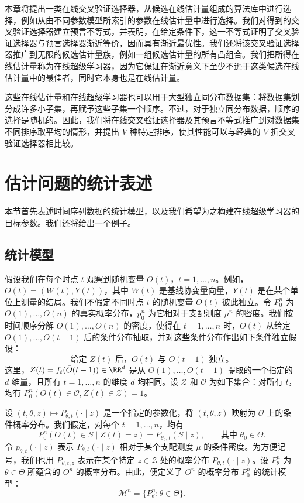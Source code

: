 \begin{sourcebox}
本章将提出一类在线交叉验证选择器，从候选在线估计量组成的算法库中进行选择，例如从由不同参数模型所索引的参数在线估计量中进行选择。我们对得到的交叉验证选择器建立预言不等式，并表明，在给定条件下，这一不等式证明了交叉验证选择器与预言选择器渐近等价，因而具有渐近最优性。我们还将该交叉验证选择器推广到无限的候选估计量族，例如一组候选估计量的所有凸组合。我们把所得在线估计量称为在线超级学习器，因为它保证在渐近意义下至少不逊于这类候选在线估计量中的最佳者，同时它本身也是在线估计量。
\end{sourcebox}

这些在线估计量和在线超级学习器也可以用于大型独立同分布数据集：将数据集划分成许多小子集，再赋予这些子集一个顺序。不过，对于独立同分布数据，顺序的选择是随机的。因此，我们将在线交叉验证选择器及其预言不等式推广到对数据集不同排序取平均的情形，并提出 $V$ 种特定排序，使其性能可以与经典的 $V$ 折交叉验证选择器相比较。

\section{估计问题的统计表述}

本节首先表述时间序列数据的统计模型，以及我们希望为之构建在线超级学习器的目标参数。我们还将给出一个例子。

\subsection{统计模型}

假设我们在每个时点 $t$ 观察到随机变量 $O(t)$，$t=1,\ldots,n$。例如，$O(t)=(W(t),Y(t))$，其中 $W(t)$ 是基线协变量向量，$Y(t)$ 是在某个单位上测量的结局。我们不假定不同时点 $t$ 的随机变量 $O(t)$ 彼此独立。令 $P_0^n$ 为 $O(1),\ldots,O(n)$ 的真实概率分布，$p_0^n$ 为它相对于支配测度 $\mu^n$ 的密度。我们按时间顺序分解 $O(1),\ldots,O(n)$ 的密度，使得在 $t=1,\ldots,n$ 时，$O(t)$ 从给定 $O(1),\ldots,O(t-1)$ 后的条件分布抽取，并对这些条件分布作出如下条件独立假设：
\begin{equation}
 \text{给定 }Z(t)\text{ 后，}O(t)\text{ 与 }\bar O(t-1)\text{ 独立。}
 \tag{18.1}
\end{equation}
这里，$Z(t)=f_t(\bar O(t-1))\in\RR^d$ 是从 $O(1),\ldots,O(t-1)$ 提取的一个指定的 $d$ 维量，且所有 $t=1,\ldots,n$ 的维度 $d$ 均相同。设 $\mathcal Z$ 和 $\mathcal O$ 为如下集合：对所有 $t$，均有 $P_0^n(O(t)\in\mathcal O,Z(t)\in\mathcal Z)=1$。

设 $(t,\theta,z)\mapsto P_{\theta,t}(\cdot\mid z)$ 是一个指定的参数化，将 $(t,\theta,z)$ 映射为 $\mathcal O$ 上的条件概率分布。我们假定，对每个 $t=1,\ldots,n$，均有
\begin{equation}
 P_0^n(O(t)\in S\mid Z(t)=z)=P_{\theta_0,t}(S\mid z),
 \qquad \text{其中 }\theta_0\in\Theta.
 \tag{18.2}
\end{equation}
令 $p_{\theta,t}(\cdot\mid z)$ 表示 $P_{\theta,t}(\cdot\mid z)$ 相对于某个支配测度 $\mu$ 的条件密度。为方便记号，我们也用 $P_{\theta,t,z}$ 表示在某个特定 $z\in\mathcal Z$ 处的概率分布 $P_{\theta,t}(\cdot\mid z)$。设 $P_\theta^n$ 为 $\theta\in\Theta$ 所蕴含的 $O^n$ 的概率分布。由此，便定义了 $O^n$ 的概率分布 $P_0^n$ 的统计模型：
\[
 \mathcal M^n=\{P_\theta^n:\theta\in\Theta\}.
\]

